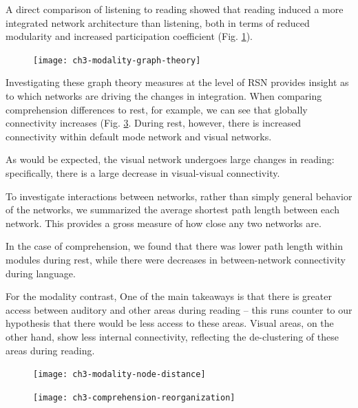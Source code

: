 A direct comparison of listening to reading showed that reading induced a more integrated network architecture than listening, both in terms of reduced modularity and increased participation coefficient (Fig. \ref{fig:ch3-modality-graph-theory}).

\begin{figure}[t]
	\centering
	\texttt{[image: ch3-modality-graph-theory]}
    \caption[Reading is more integrated than listening.]{}
	\label{fig:ch3-modality-graph-theory}
\end{figure}

Investigating these graph theory measures at the level of RSN provides  insight as to which networks are driving the changes in integration. When comparing comprehension differences to rest, for example, we can see that globally connectivity increases (Fig. \ref{fig:ch3-comprehension-reorganization}. During rest, however, there is increased connectivity within default mode network and visual networks.

As would be expected, the visual network undergoes large changes in reading: specifically, there is a large decrease in visual-visual connectivity. 

To investigate interactions between networks, rather than simply general behavior of the networks, we summarized the average shortest path length between each network. This provides a gross measure of how close any two networks are. 

In the case of comprehension, we found that there was lower path length within modules during rest, while there were decreases in between-network connectivity during language.

For the modality contrast, One of the main takeaways is that there is greater access between auditory and other areas during reading -- this runs counter to our hypothesis that there would be less access to these areas. Visual areas, on the other hand, show less internal connectivity, reflecting the de-clustering of these areas during reading. 

\begin{figure}[t]
	\centering
	\texttt{[image: ch3-modality-node-distance]}
    \caption[Summary of the change in distance between nodes during reading and listening.]{}
	\label{fig:ch3-modality-node-distance}
\end{figure}

\begin{figure}[t]
	\centering
	\texttt{[image: ch3-comprehension-reorganization]}
    \caption[Language increases between-network connectivity.]{}
	\label{fig:ch3-comprehension-reorganization}
\end{figure}



